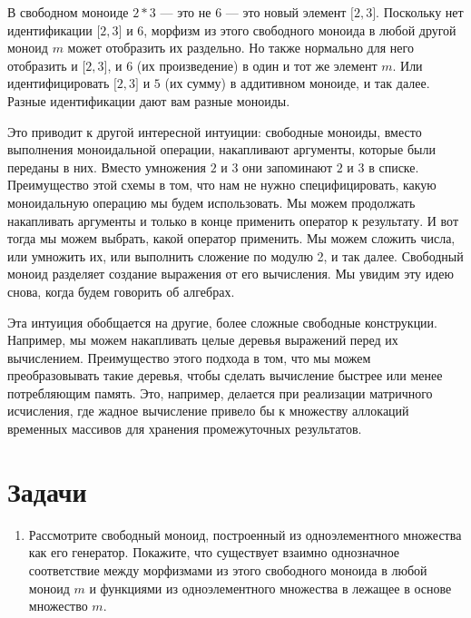 В свободном моноиде $2 * 3$ --- это не $6$ --- это новый элемент ${[}2, 3{]}$. Поскольку
нет идентификации ${[}2, 3{]}$ и $6$, морфизм из этого
свободного моноида в любой другой моноид $m$ может отобразить их
раздельно. Но также нормально для него отобразить и ${[}2, 3{]}$, и $6$
(их произведение) в один и тот же элемент $m$. Или идентифицировать ${[}2,
  3{]}$ и $5$ (их сумму) в аддитивном моноиде, и так далее. Разные
идентификации дают вам разные моноиды.

Это приводит к другой интересной интуиции: свободные моноиды, вместо
выполнения моноидальной операции, накапливают аргументы, которые были
переданы в них. Вместо умножения $2$ и $3$ они запоминают $2$ и $3$ в
списке. Преимущество этой схемы в том, что нам не нужно специфицировать, какую
моноидальную операцию мы будем использовать. Мы можем продолжать накапливать аргументы и
только в конце применить оператор к результату. И вот тогда мы
можем выбрать, какой оператор применить. Мы можем сложить числа, или умножить
их, или выполнить сложение по модулю 2, и так далее. Свободный моноид разделяет
создание выражения от его вычисления. Мы увидим эту идею
снова, когда будем говорить об алгебрах.

Эта интуиция обобщается на другие, более сложные свободные конструкции.
Например, мы можем накапливать целые деревья выражений перед их вычислением.
Преимущество этого подхода в том, что мы можем преобразовывать такие деревья,
чтобы сделать вычисление быстрее или менее потребляющим память. Это, например,
делается при реализации матричного исчисления, где жадное вычисление
привело бы к множеству аллокаций временных массивов для хранения
промежуточных результатов.

\section{Задачи}

\begin{enumerate}
  \tightlist
  \item
        Рассмотрите свободный моноид, построенный из одноэлементного множества как его генератор.
        Покажите, что существует взаимно однозначное соответствие между морфизмами из
        этого свободного моноида в любой моноид $m$ и функциями из
        одноэлементного множества в лежащее в основе множество $m$.
\end{enumerate}
